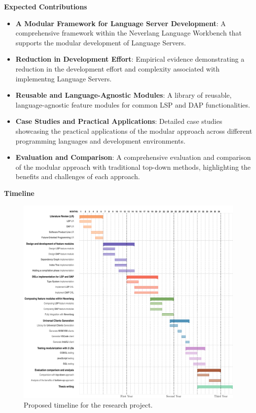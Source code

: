 \hfill \break
\noindent
\textbf{Expected Contributions}

\begin{itemize}
    \item \textbf{A Modular Framework for Language Server Development}: A comprehensive framework within the Neverlang Language Workbench that supports the modular development of Language Servers.
    \item \textbf{Reduction in Development Effort}: Empirical evidence demonstrating a reduction in the development effort and complexity associated with implementng Language Servers.
    \item \textbf{Reusable and Language-Agnostic Modules}: A library of reusable, language-agnostic feature modules for common LSP and DAP functionalities.
    \item \textbf{Case Studies and Practical Applications}: Detailed case studies showcasing the practical applications of the modular approach across different programming languages and development environments.
    \item \textbf{Evaluation and Comparison}: A comprehensive evaluation and comparison of the modular approach with traditional top-down methods, highlighting the benefits and challenges of each approach.
\end{itemize}


\hfill \break
\noindent
\textbf{Timeline}

\hfill \break
\begin{figure}[t]
    \centering
    \includegraphics[width=.9\linewidth]{figs/gantt.pdf}
    \caption{Proposed timeline for the research project.}
    \label{fig:gantt}
\end{figure}

